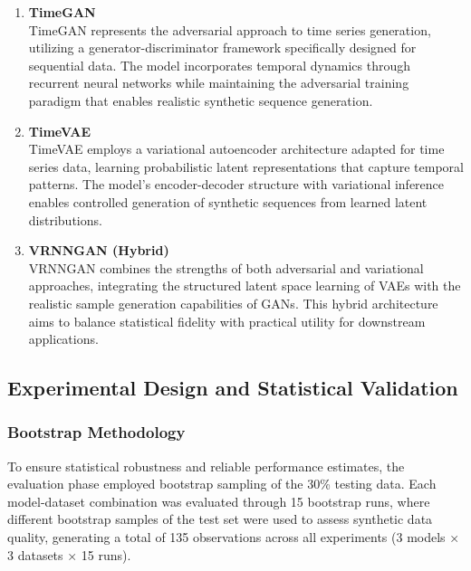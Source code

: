 \documentclass[11pt]{article}
\begin{document}
\begin{enumerate}
    \item \textbf{TimeGAN}\\
    TimeGAN \parencite{yoon_time-series_2019} represents the adversarial approach to time series generation, utilizing a generator-discriminator framework specifically designed for sequential data. The model incorporates temporal dynamics through recurrent neural networks while maintaining the adversarial training paradigm that enables realistic synthetic sequence generation.

    \item \textbf{TimeVAE}\\
    TimeVAE \parencite{desai_timevae_2021} employs a variational autoencoder architecture adapted for time series data, learning probabilistic latent representations that capture temporal patterns. The model's encoder-decoder structure with variational inference enables controlled generation of synthetic sequences from learned latent distributions.

    \item \textbf{VRNNGAN (Hybrid)}\\
    VRNNGAN \parencite{lee_vrnngan_2022} combines the strengths of both adversarial and variational approaches, integrating the structured latent space learning of VAEs with the realistic sample generation capabilities of GANs. This hybrid architecture aims to balance statistical fidelity with practical utility for downstream applications.
\end{enumerate}

\subsection{Experimental Design and Statistical Validation}

\subsubsection{Bootstrap Methodology}
To ensure statistical robustness and reliable performance estimates, the evaluation phase employed bootstrap sampling of the 30\% testing data. Each model-dataset combination was evaluated through 15 bootstrap runs, where different bootstrap samples of the test set were used to assess synthetic data quality, generating a total of 135 observations across all experiments (3 models × 3 datasets × 15 runs).
\end{document}
